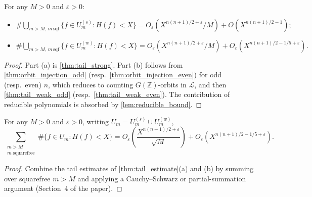 \begin{theorem}
  \label{thm:tail_estimate}
  For any \(M>0\) and \(\varepsilon>0\):
  \begin{itemize}
    \item[(a)]
      \(\#\bigcup_{m>M,\,m\,\text{sqf}}\{f\in U_m^{(s)} : H(f)<X\}
      = O_\varepsilon(X^{n(n+1)/2+\varepsilon}/M)
      + O(X^{n(n+1)/2-1});\)
    \item[(b)]
      \(\#\bigcup_{m>M,\,m\,\text{sqf}}\{f\in U_m^{(w)} : H(f)<X\}
      = O_\varepsilon(X^{n(n+1)/2+\varepsilon}/M)
      + O_\varepsilon(X^{n(n+1)/2-1/5+\varepsilon}).\)
  \end{itemize}
\end{theorem}
\begin{proof}
  Part (a) is \cref{thm:tail_strong}.  Part (b) follows from
  \cref{thm:orbit_injection_odd} (resp.\ \cref{thm:orbit_injection_even})
  for odd (resp.\ even) \(n\), which reduces to counting
  \(G(\mathbb{Z})\)-orbits in \(\mathcal{L}\), and then
  \cref{thm:tail_weak_odd} (resp.\ \cref{thm:tail_weak_even}).
  The contribution of reducible polynomials is absorbed by
  \cref{lem:reducible_bound}.
\end{proof}

\begin{theorem}
  \label{thm:uniformity}
  For any \(M>0\) and \(\varepsilon>0\), writing
  \(U_m=U_m^{(s)}\cup U_m^{(w)}\),
  \[
    \sum_{\substack{m>M\\m\;\text{squarefree}}}
    \#\{f\in U_m : H(f)<X\}
    = O_\varepsilon\!\left(\frac{X^{n(n+1)/2+\varepsilon}}{\sqrt{M}}\right)
    + O_\varepsilon\!\left(X^{n(n+1)/2-1/5+\varepsilon}\right).
  \]
\end{theorem}
\begin{proof}
  Combine the tail estimates of \cref{thm:tail_estimate}(a) and (b)
  by summing over squarefree \(m>M\) and applying a Cauchy--Schwarz or
  partial-summation argument (Section~4 of the paper).
\end{proof}


